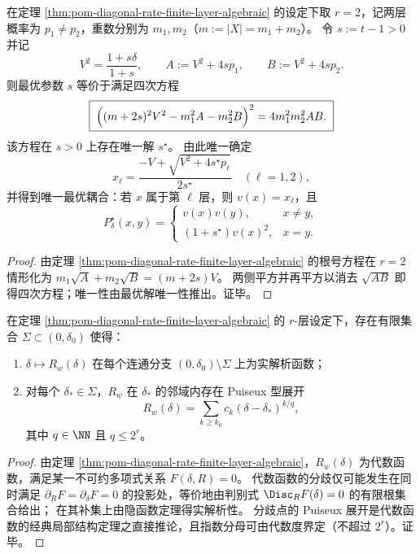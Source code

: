 \begin{corollary}[两层分布的四次闭合解与显式最优耦合]\label{cor:pom-diagonal-rate-two-layer-quartic}
在定理 \ref{thm:pom-diagonal-rate-finite-layer-algebraic} 的设定下取 \(r=2\)，记两层概率为 \(p_1\ne p_2\)，重数分别为 \(m_1,m_2\)（\(m:=|X|=m_1+m_2\)）。
令 \(s:=t-1>0\) 并记
\[
V^2=\frac{1+s\delta}{1+s},
\qquad
A:=V^2+4sp_1,\qquad B:=V^2+4sp_2.
\]
则最优参数 \(s\) 等价于满足四次方程
\[
\boxed{\;
\Bigl((m+2s)^2V^2-m_1^2A-m_2^2B\Bigr)^2=4m_1^2m_2^2AB.\;}
\]
该方程在 \(s>0\) 上存在唯一解 \(s^\star\)。
由此唯一确定
\[
x_\ell=\frac{-V+\sqrt{V^2+4s^\star p_\ell}}{2s^\star}\quad(\ell=1,2),
\]
并得到唯一最优耦合：若 \(x\) 属于第 \(\ell\) 层，则 \(v(x)=x_\ell\)，且
\[
P^\star_\delta(x,y)=
\begin{cases}
v(x)v(y), & x\ne y,\\
(1+s^\star)v(x)^2, & x=y.
\end{cases}
\]
\end{corollary}
\begin{proof}
由定理 \ref{thm:pom-diagonal-rate-finite-layer-algebraic} 的根号方程在 \(r=2\) 情形化为
\(
m_1\sqrt{A}+m_2\sqrt{B}=(m+2s)V
\)。
两侧平方并再平方以消去 \(\sqrt{AB}\) 即得四次方程；唯一性由最优解唯一性推出。证毕。
\end{proof}

\begin{proposition}\label{prop:pom-diagonal-rate-finite-layer-algebraic-phase-diagram}
在定理 \ref{thm:pom-diagonal-rate-finite-layer-algebraic} 的 \(r\)-层设定下，存在有限集合 \(\Sigma\subset(0,\delta_0)\) 使得：
\begin{enumerate}
  \item \(\delta\mapsto R_w(\delta)\) 在每个连通分支 \((0,\delta_0)\setminus\Sigma\) 上为实解析函数；
  \item 对每个 \(\delta_*\in\Sigma\)，\(R_w\) 在 \(\delta_*\) 的邻域内存在 Puiseux 型展开
  \[
  R_w(\delta)=\sum_{k\ge k_0} c_k(\delta-\delta_*)^{k/q},
  \]
  其中 \(q\in\NN\) 且 \(q\le 2^r\)。
\end{enumerate}
\end{proposition}
\begin{proof}
由定理 \ref{thm:pom-diagonal-rate-finite-layer-algebraic}，\(R_w(\delta)\) 为代数函数，满足某一不可约多项式关系 \(F(\delta,R)=0\)。
代数函数的分歧仅可能发生在同时满足 \(\partial_R F=\partial_\delta F=0\) 的投影处，等价地由判别式 \(\Disc_R F(\delta)=0\) 的有限根集合给出；
在其补集上由隐函数定理得实解析性。
分歧点的 Puiseux 展开是代数函数的经典局部结构定理之直接推论，且指数分母可由代数度界定（不超过 \(2^r\)）。证毕。
\end{proof}

